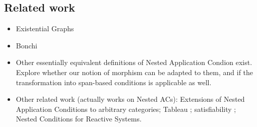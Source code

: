 \subsection{Related work}

\begin{itemize}
\item Existential Graphs
\item Bonchi
\item Other essentially equivalent definitions of Nested Application Condion exist. Explore whether our notion of morphism can be adapted to them, and if the transformation into span-based conditions is applicable as well.
\item Other related work (actually works on Nested ACs): Extensions of Nested Application Conditions to arbitrary categories; Tableau%
; satisfiability%
; Nested Conditions for Reactive Systems. 
\end{itemize}
